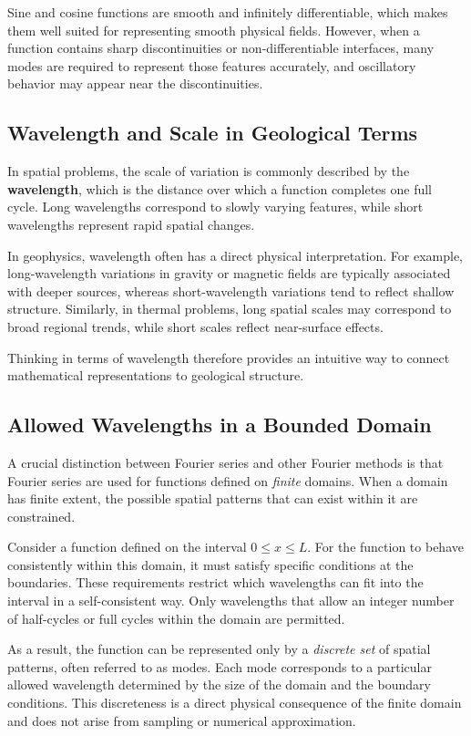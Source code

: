 Sine and cosine functions are smooth and infinitely differentiable, which makes them well suited for representing smooth physical fields. However, when a function contains sharp discontinuities or non-differentiable interfaces, many modes are required to represent those features accurately, and oscillatory behavior may appear near the discontinuities.

\subsection{Wavelength and Scale in Geological Terms}

In spatial problems, the scale of variation is commonly described by the \textbf{wavelength}, which is the distance over which a function completes one full cycle. Long wavelengths correspond to slowly varying features, while short wavelengths represent rapid spatial changes.

In geophysics, wavelength often has a direct physical interpretation. For example, long-wavelength variations in gravity or magnetic fields are typically associated with deeper sources, whereas short-wavelength variations tend to reflect shallow structure. Similarly, in thermal problems, long spatial scales may correspond to broad regional trends, while short scales reflect near-surface effects.

Thinking in terms of wavelength therefore provides an intuitive way to connect mathematical representations to geological structure.

\subsection{Allowed Wavelengths in a Bounded Domain}

A crucial distinction between Fourier series and other Fourier methods is that Fourier series are used for functions defined on \emph{finite} domains. When a domain has finite extent, the possible spatial patterns that can exist within it are constrained.

Consider a function defined on the interval $0 \le x \le L$. For the function to behave consistently within this domain, it must satisfy specific conditions at the boundaries. These requirements restrict which wavelengths can fit into the interval in a self-consistent way. Only wavelengths that allow an integer number of half-cycles or full cycles within the domain are permitted.

As a result, the function can be represented only by a \emph{discrete set} of spatial patterns, often referred to as modes. Each mode corresponds to a particular allowed wavelength determined by the size of the domain and the boundary conditions. This discreteness is a direct physical consequence of the finite domain and does not arise from sampling or numerical approximation.


